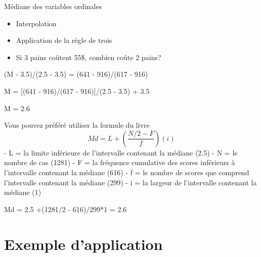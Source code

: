 \documentclass[
  ignorenonframetext,
]{beamer}
\providecommand{\tightlist}{%
  \setlength{\itemsep}{0pt}\setlength{\parskip}{0pt}}
\begin{document}
\begin{frame}{Médiane des variables ordinales}
\protect\hypertarget{muxe9diane-des-variables-ordinales-3}{}
\begin{itemize}
\tightlist
\item
  Interpolation
\item
  Application de la règle de trois
\item
  Si 3 pains coûtent 55\$, combien coûte 2 pains?
\end{itemize}

(M - 3.5)/(2.5 - 3.5) = (641 - 916)/(617 - 916)

M = {[}(641 - 916)/(617 - 916){]}/(2.5 - 3.5) + 3.5

M = 2.6
\end{frame}

\begin{frame}{Vous pouvez préféré utiliser la formule du livre}
\protect\hypertarget{vous-pouvez-pruxe9fuxe9ruxe9-utiliser-la-formule-du-livre}{}
\[Md = L + (\frac{N/2 - F}{f})(i)\] - L = la limite inférieure de
l'intervalle contenant la médiane (2.5) - N = le nombre de cas (1281) -
F = la fréquence cumulative des scores inférieurs à l'intervalle
contenant la médiane (616) - f = le nombre de scores que comprend
l'intervalle contenant la médiane (299) - i = la largeur de l'intervalle
contenant la médiane (1)

Md = 2.5 +(1281/2 - 616)/299*1 = 2.6
\end{frame}

\hypertarget{exemple-dapplication}{%
\section{Exemple d'application}\label{exemple-dapplication}}
\end{document}
